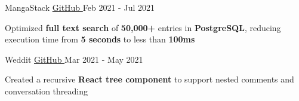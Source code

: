 
\begin{cventries}
  \cventry
    {\fontsize{10pt}{1em}\bodyfont\upshape{}} %
    {MangaStack} %
    {\href{https://github.com/tacticaltofu/mangastack}{GitHub \faExternalLink}} %
    {Feb 2021 - Jul 2021} %
    {
      \begin{cvitems} %
        \item {Optimized \textbf{full text search} of \textbf{50,000+} entries in \textbf{PostgreSQL}, reducing execution time from \textbf{5 seconds} to less than \textbf{100ms}}
      \end{cvitems}
    }
    
  \cventry
    {\fontsize{10pt}{1em}\bodyfont\upshape{}} %
    {Weddit} %
    {\href{https://github.com/tacticaltofu/reddit-clone}{GitHub \faExternalLink}} %
    {Mar 2021 - May 2021} %
    {
      \begin{cvitems} %
        \item {Created a recursive \textbf{React tree component} to support nested comments and conversation threading}
      \end{cvitems}
    }
\end{cventries}